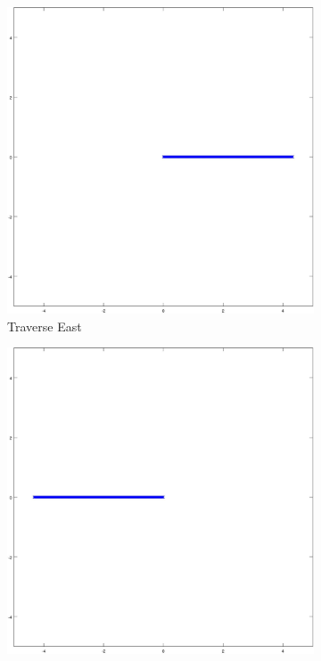 \documentclass{article}
\begin{document}
\begin{figure}[H]
	\centering
	
	\begin{subfigure}[b]{0.32\linewidth}
		\includegraphics[width=\textwidth]{images/traverse_east.jpg}
		\caption{Traverse East}
	\end{subfigure}
	\begin{subfigure}[b]{0.32\linewidth}
		\includegraphics[width=\textwidth]{images/traverse_west.jpg}

\end{subfigure}
\end{figure}
\end{document}
